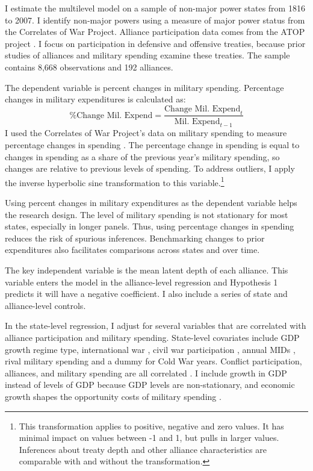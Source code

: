 \documentclass[12pt]{article}
\begin{document}
I estimate the multilevel model on a sample of non-major power states from 1816 to 2007. 
I identify non-major powers using a measure of major power status from the Correlates of War Project. 
Alliance participation data comes from the ATOP project \citep{Leedsetal2002}.  
I focus on participation in defensive and offensive treaties, because prior studies of alliances and military spending examine these treaties. 
The sample contains 8,668 observations and 192 alliances. 


The dependent variable is percent changes in military spending.
Percentage changes in military expenditures is calculated as:
\begin{equation}
\mbox{\% Change Mil. Expend} = \frac{ \mbox{Change Mil. Expend}_t }{ \mbox{Mil. Expend}_{t-1} }
\end{equation} 
I used the Correlates of War Project's data on military spending to measure percentage changes in spending \citep{SingerCINC1988}. 
The percentage change in spending is equal to changes in spending as a share of the previous year's military spending, so changes are relative to previous levels of spending. 
To address outliers, I apply the inverse hyperbolic sine transformation to this variable.\footnote{This transformation applies to positive, negative and zero values. It has minimal impact on values between -1 and 1, but pulls in larger values. Inferences about treaty depth and other alliance characteristics are comparable with and without the transformation.}


Using percent changes in military expenditures as the dependent variable helps the research design. 
The level of military spending is not stationary for most states, especially in longer panels. 
Thus, using percentage changes in spending reduces the risk of spurious inferences.
Benchmarking changes to prior expenditures also facilitates comparisons across states and over time. 


The key independent variable is the mean latent depth of each alliance. 
This variable enters the model in the alliance-level regression and Hypothesis 1 predicts it will have a negative coefficient. 
I also include a series of state and alliance-level controls. 


In the state-level regression, I adjust for several variables that are correlated with alliance participation and military spending. 
State-level covariates include GDP growth \citep{Boltetal2018} regime type, international war \cite{Reiteretal2016}, civil war participation \citep{SarkeesWayman2010}, annual MIDs \citep{Gibleretal2016}, rival military spending \citep{ThompsonDreyer2012} and a dummy for Cold War years.
Conflict participation, alliances, and military spending are all correlated \citep{SeneseVasquez2008}.
I include growth in GDP instead of levels of GDP because GDP levels are non-stationary, and economic growth shapes the opportunity costs of military spending \citep{Kimball2010, Zielinskietal2017}.  
\end{document}
